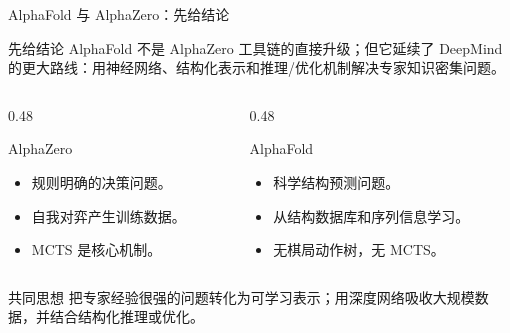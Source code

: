 \documentclass[UTF8,aspectratio=169,10pt]{ctexbeamer}
\begin{document}
\begin{frame}{AlphaFold 与 AlphaZero：先给结论}
  \small
  \begin{alertblock}{先给结论}
    AlphaFold 不是 AlphaZero 工具链的直接升级；但它延续了 DeepMind 的更大路线：用神经网络、结构化表示和推理/优化机制解决专家知识密集问题。
  \end{alertblock}

  \begin{columns}[T,onlytextwidth]
    \begin{column}{0.48\textwidth}
      \begin{block}{AlphaZero}
        \begin{itemize}
          \item 规则明确的决策问题。
          \item 自我对弈产生训练数据。
          \item MCTS 是核心机制。
        \end{itemize}
      \end{block}
    \end{column}
    \begin{column}{0.48\textwidth}
      \begin{block}{AlphaFold}
        \begin{itemize}
          \item 科学结构预测问题。
          \item 从结构数据库和序列信息学习。
          \item 无棋局动作树，无 MCTS。
        \end{itemize}
      \end{block}
    \end{column}
  \end{columns}

  \begin{block}{共同思想}
    把专家经验很强的问题转化为可学习表示；用深度网络吸收大规模数据，并结合结构化推理或优化。
  \end{block}
\end{frame}
\end{document}
